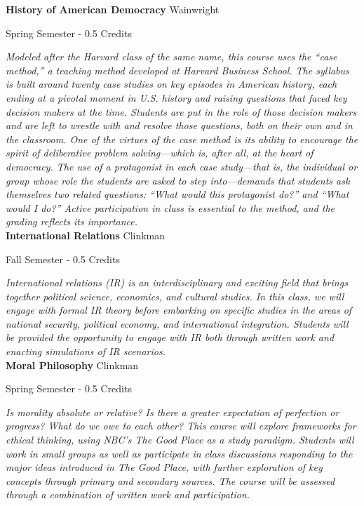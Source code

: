 \noindent\textbf{History of American Democracy} \hfill Wainwright

\noindent Spring Semester - 0.5 Credits

\vspace{1mm}\emph{Modeled after the Harvard class of the same name, this course uses the “case method,” a teaching method developed at Harvard Business School. The syllabus is built around twenty case studies on key episodes in American history, each ending at a pivotal moment in U.S. history and raising questions that faced key decision makers at the time. Students are put in the role of those decision makers and are left to wrestle with and resolve those questions, both on their own and in the classroom. One of the virtues of the case method is its ability to encourage the spirit of deliberative problem solving—which is, after all, at the heart of democracy. The use of a protagonist in each case study—that is, the individual or group whose role the students are asked to step into—demands that students ask themselves two related questions: “What would this protagonist do?” and “What would I do?” Active participation in class is essential to the method, and the grading reflects its importance.}\\

\noindent\textbf{International Relations} \hfill Clinkman

\noindent Fall Semester - 0.5 Credits

\vspace{1mm}\emph{International relations (IR) is an interdisciplinary and exciting field that brings together political science, economics, and cultural studies. In this class, we will engage with formal IR theory before embarking on specific studies in the areas of national security, political economy, and international integration. Students will be provided the opportunity to engage with IR both through written work and enacting simulations of IR scenarios.}\\

\noindent\textbf{Moral Philosophy} \hfill Clinkman

\noindent Spring Semester - 0.5 Credits

\vspace{1mm}\emph{Is morality absolute or relative? Is there a greater expectation of perfection or progress? What do we owe to each other? This course will explore frameworks for ethical thinking, using NBC’s The Good Place as a study paradigm. Students will work in small groups as well as participate in class discussions responding to the major ideas introduced in The Good Place, with further exploration of key concepts through primary and secondary sources. The course will be assessed through a combination of written work and participation.}\\

